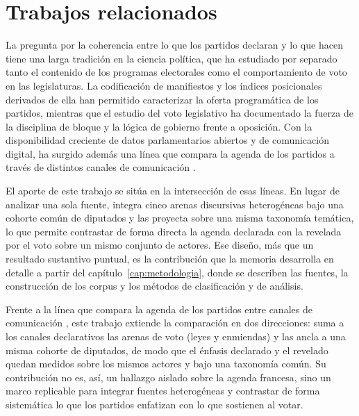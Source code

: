 \section{Trabajos relacionados}
\label{sec:trabajos-relacionados}

La pregunta por la coherencia entre lo que los partidos declaran y lo que hacen
tiene una larga tradición en la ciencia política, que ha estudiado por separado
tanto el contenido de los programas electorales como el comportamiento de voto en
las legislaturas. La codificación de manifiestos y los índices posicionales
derivados de ella han permitido caracterizar la oferta programática de los
partidos, mientras que el estudio del voto legislativo ha documentado la fuerza de
la disciplina de bloque y la lógica de gobierno frente a oposición. Con la
disponibilidad creciente de datos parlamentarios abiertos y de comunicación
digital, ha surgido además una línea que compara la agenda de los partidos a
través de distintos canales de comunicación \cite{ivanusch2024channels}.

El aporte de este trabajo se sitúa en la intersección de esas líneas. En lugar de
analizar una sola fuente, integra cinco arenas discursivas heterogéneas bajo una
cohorte común de diputados y las proyecta sobre una misma taxonomía temática, lo
que permite contrastar de forma directa la agenda declarada con la revelada por el
voto sobre un mismo conjunto de actores. Ese diseño, más que un resultado
sustantivo puntual, es la contribución que la memoria desarrolla en detalle a
partir del capítulo~\ref{cap:metodologia}, donde se describen las fuentes, la
construcción de los corpus y los métodos de clasificación y de análisis.

Frente a la línea que compara la agenda de los partidos entre canales de
comunicación \cite{ivanusch2024channels}, este trabajo extiende la comparación en
dos direcciones: suma a los canales declarativos las arenas de voto (leyes y
enmiendas) y las ancla a una misma cohorte de diputados, de modo que el énfasis
declarado y el revelado quedan medidos sobre los mismos actores y bajo una
taxonomía común. Su contribución no es, así, un hallazgo aislado sobre la agenda
francesa, sino un marco replicable para integrar fuentes heterogéneas y contrastar
de forma sistemática lo que los partidos enfatizan con lo que sostienen al votar.
